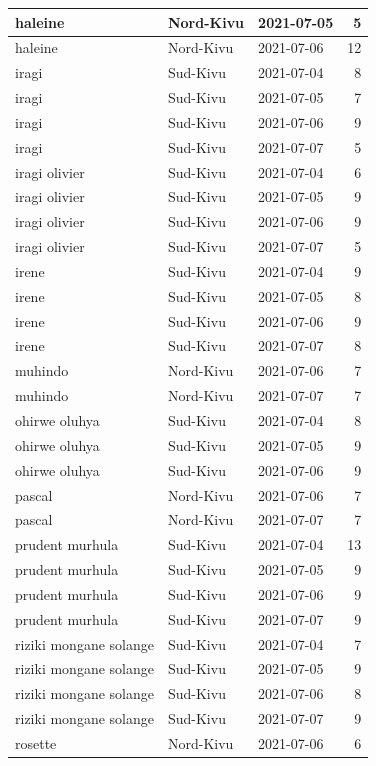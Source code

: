 \documentclass[
]{book}
\begin{document}
\begin{table}
\begin{tabular}[t]{l|l|l|r}
\hline
haleine & Nord-Kivu & 2021-07-05 & 5\\
\hline
haleine & Nord-Kivu & 2021-07-06 & 12\\
\hline
iragi & Sud-Kivu & 2021-07-04 & 8\\
\hline
iragi & Sud-Kivu & 2021-07-05 & 7\\
\hline
iragi & Sud-Kivu & 2021-07-06 & 9\\
\hline
iragi & Sud-Kivu & 2021-07-07 & 5\\
\hline
iragi olivier & Sud-Kivu & 2021-07-04 & 6\\
\hline
iragi olivier & Sud-Kivu & 2021-07-05 & 9\\
\hline
iragi olivier & Sud-Kivu & 2021-07-06 & 9\\
\hline
iragi olivier & Sud-Kivu & 2021-07-07 & 5\\
\hline
irene & Sud-Kivu & 2021-07-04 & 9\\
\hline
irene & Sud-Kivu & 2021-07-05 & 8\\
\hline
irene & Sud-Kivu & 2021-07-06 & 9\\
\hline
irene & Sud-Kivu & 2021-07-07 & 8\\
\hline
muhindo & Nord-Kivu & 2021-07-06 & 7\\
\hline
muhindo & Nord-Kivu & 2021-07-07 & 7\\
\hline
ohirwe oluhya & Sud-Kivu & 2021-07-04 & 8\\
\hline
ohirwe oluhya & Sud-Kivu & 2021-07-05 & 9\\
\hline
ohirwe oluhya & Sud-Kivu & 2021-07-06 & 9\\
\hline
pascal & Nord-Kivu & 2021-07-06 & 7\\
\hline
pascal & Nord-Kivu & 2021-07-07 & 7\\
\hline
prudent murhula & Sud-Kivu & 2021-07-04 & 13\\
\hline
prudent murhula & Sud-Kivu & 2021-07-05 & 9\\
\hline
prudent murhula & Sud-Kivu & 2021-07-06 & 9\\
\hline
prudent murhula & Sud-Kivu & 2021-07-07 & 9\\
\hline
riziki mongane solange & Sud-Kivu & 2021-07-04 & 7\\
\hline
riziki mongane solange & Sud-Kivu & 2021-07-05 & 9\\
\hline
riziki mongane solange & Sud-Kivu & 2021-07-06 & 8\\
\hline
riziki mongane solange & Sud-Kivu & 2021-07-07 & 9\\
\hline
rosette & Nord-Kivu & 2021-07-06 & 6\\

\end{tabular}
\end{table}
\end{document}
